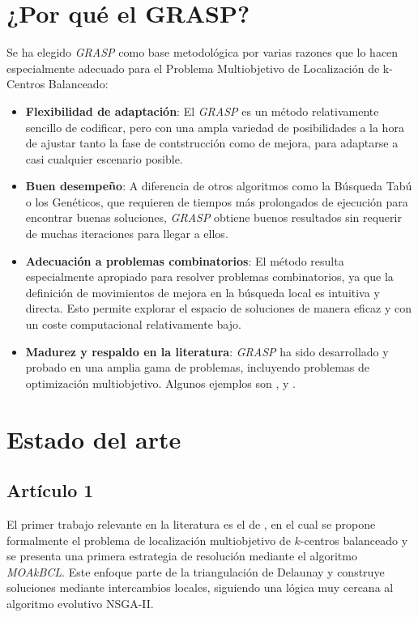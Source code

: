 \documentclass[12pt,a4paper]{book}
\begin{document}
\section{¿Por qué el GRASP?}
Se ha elegido \textit{GRASP} como base metodológica por varias razones que lo hacen especialmente adecuado para el Problema Multiobjetivo de Localización de k-Centros Balanceado:
\begin{itemize}
    \item \textbf{Flexibilidad de adaptación}: El \textit{GRASP} es un método relativamente sencillo de codificar, pero con una ampla variedad de posibilidades
    a la hora de ajustar tanto la fase de contstrucción como de mejora, para adaptarse a casi cualquier escenario posible. 
    \item \textbf{Buen desempeño}: A diferencia de otros algoritmos como la Búsqueda Tabú o los Genéticos, que requieren de tiempos más prolongados de ejecución para encontrar buenas soluciones,
    \textit{GRASP} obtiene buenos resultados sin requerir de muchas iteraciones para llegar a ellos.
    \item \textbf{Adecuación a problemas combinatorios}: El método resulta especialmente apropiado para resolver problemas combinatorios, ya que la definición de movimientos de mejora en la búsqueda local es intuitiva y directa.
    Esto permite explorar el espacio de soluciones de manera eficaz y con un coste computacional relativamente bajo.
    \item \textbf{Madurez y respaldo en la literatura}: \textit{GRASP} ha sido desarrollado y probado en una amplia gama de problemas, incluyendo problemas de optimización multiobjetivo. Algunos ejemplos son \cite{grasp_1}, \cite{grasp_3} y \cite{grasp_2}. 
\end{itemize}

\section{Estado del arte}

\subsection{Artículo 1}
El primer trabajo relevante en la literatura es el de \cite{k-balanced_1}, en el cual se propone formalmente el problema de localización multiobjetivo de $k$-centros balanceado y se presenta una primera estrategia de resolución mediante el algoritmo \textit{MOAkBCL}.
Este enfoque parte de la triangulación de Delaunay \citep{delaunay} y construye soluciones mediante intercambios locales, siguiendo una lógica muy cercana al algoritmo evolutivo NSGA-II.
\end{document}
